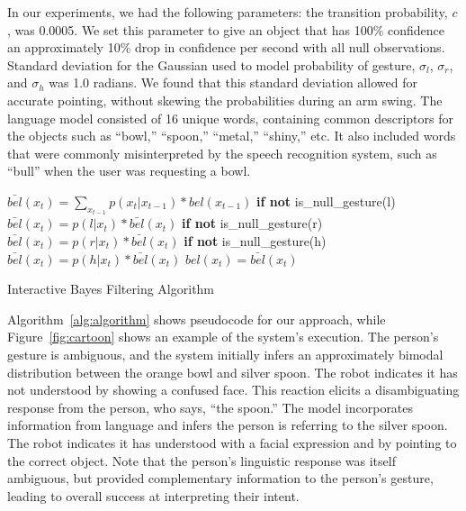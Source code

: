 \documentclass[graybox]{svmult}
\begin{document}
In our experiments, we had the following parameters: the transition
probability, $c$, was 0.0005. We set this parameter to give an object
that has 100\% confidence an approximately 10\% drop in confidence per
second with all null observations.  Standard deviation for the
Gaussian used to model probability of gesture, $\sigma_l$, $\sigma_r$,
and $\sigma_h$ was 1.0 radians. We found that this standard deviation
allowed for accurate pointing, without skewing the probabilities
during an arm swing.  The language model consisted of 16 unique words,
containing common descriptors for the objects such as ``bowl,''
``spoon,'' ``metal,'' ``shiny,'' etc. It also included words that were
commonly misinterpreted by the speech recognition system, such as
``bull'' when the user was requesting a bowl.


\begin{algorithm}
    \DontPrintSemicolon
    \BlankLine
    \BlankLine
     {
      $\bar{bel}(x_t) = \displaystyle\sum_{x_{t-1}} p(x_t|x_{t-1})*bel(x_{t-1})$
      \BlankLine
      \textbf{if not} is\_null\_gesture(l)
      \BlankLine
      \Indp$\bar{bel}(x_t) = p(l | x_t) *  \bar{bel}(x_t)$
      \BlankLine
      \Indm\textbf{if not} is\_null\_gesture(r)
      \BlankLine
      \Indp$\bar{bel}(x_t) = p(r | x_t) *  \bar{bel}(x_t)$
      \BlankLine
      \Indm\textbf{if not} is\_null\_gesture(h)
      \BlankLine
      \Indp$\bar{bel}(x_t) = p(h | x_t) *  \bar{bel}(x_t)$
      \BlankLine
      \Indm{}
      $bel(x_t) = \bar{bel}(x_t)$

    }
    \BlankLine
\caption{Interactive Bayes Filtering Algorithm} 
\label{alg:algorithm}
\end{algorithm}

Algorithm~\ref{alg:algorithm} shows pseudocode for our approach, while
Figure~\ref{fig:cartoon} shows an example of the system's execution.
The person's gesture is ambiguous, and the system initially infers an
approximately bimodal distribution between the orange bowl and silver
spoon.  The robot indicates it has not understood by showing a
confused face.  This reaction elicits a disambiguating response from
the person, who says, ``the spoon.''  The model incorporates
information from language and infers the person is referring to the
silver spoon.  The robot indicates it has understood with a facial
expression and by pointing to the correct object.  Note that the
person's linguistic response was itself ambiguous, but provided
complementary information to the person's gesture, leading to overall
success at interpreting their intent.
\end{document}
